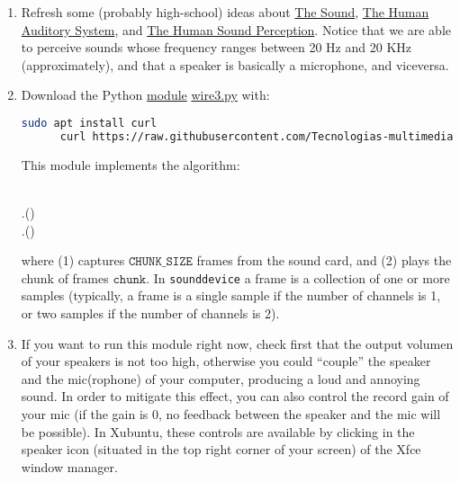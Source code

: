 \begin{enumerate}

\item Refresh some (probably high-school) ideas about
  \href{https://vicente-gonzalez-ruiz.github.io/the_sound/}{The
    Sound}, \href{https://vicente-gonzalez-ruiz.github.io/human_auditory_system/}{The
    Human Auditory System},
    and \href{https://vicente-gonzalez-ruiz.github.io/human_sound_perception/}{The
    Human Sound Perception}. Notice that we are able to perceive
    sounds whose frequency ranges between 20 Hz and 20 KHz
    (approximately), and that a speaker is basically a microphone, and
    viceversa.
  
\item Download the Python
  \href{https://docs.python.org/3/tutorial/modules.html}{module}
  \href{https://raw.githubusercontent.com/Tecnologias-multimedia/intercom/master/test/sounddevice/wire3.py}{wire3.py} with:

  \begin{lstlisting}[language=Bash]
      sudo apt install curl
      curl https://raw.githubusercontent.com/Tecnologias-multimedia/intercom/master/test/sounddevice/wire3.py > wire3.py
  \end{lstlisting}      
      
  This module implements the algorithm:
  
  \begin{pseudocode}[display]{}{}
    \BEGIN
       \\
      \WHILE \TRUE
      \BEGIN
         \GETS {}.() \\
        .() 
      \END
    \END
  \end{pseudocode}

  where (1) captures $\mathtt{CHUNK\_SIZE}$ frames from the sound
  card, and (2) plays the chunk of frames
  $\mathtt{chunk}$. In \texttt{sounddevice} a frame is a collection of
  one or more samples (typically, a frame is a single sample if the
  number of channels is 1, or two samples if the number of channels is
  2).

\item If you want to run this module right now, check first that the
  output volumen of your speakers is not too high, otherwise you could
  ``couple'' the speaker and the mic(rophone) of your computer,
  producing a loud and annoying sound. In order to mitigate this
  effect, you can also control the record gain of your mic (if the
  gain is 0, no feedback between the speaker and the mic will be
  possible). In Xubuntu, these controls are available by clicking in
  the speaker icon (situated in the top right corner of your screen)
  of the Xfce window manager.


\end{enumerate}
